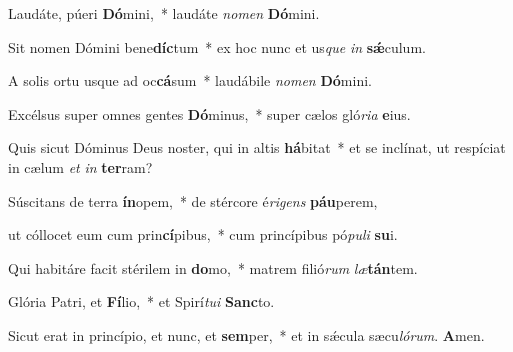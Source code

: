\item Laudáte, púeri \textbf{Dó}mini,~* laudáte \textit{nomen} \textbf{Dó}mini.

\item Sit nomen Dómini bene\textbf{díc}tum~* ex hoc nunc et us\textit{que} \textit{in} \textbf{sǽ}culum.

\item A solis ortu usque ad oc\textbf{cá}sum~* laudábile \textit{nomen} \textbf{Dó}mini.

\item Excélsus super omnes gentes \textbf{Dó}minus,~* super cælos gló\textit{ria} \textbf{e}ius.

\item Quis sicut Dóminus Deus noster, qui in altis \textbf{há}bitat~* et se inclínat, ut respíciat in cælum \textit{et} \textit{in} \textbf{ter}ram?

\item Súscitans de terra \textbf{ín}opem,~* de stércore é\textit{rigens} \textbf{páu}perem,

\item ut cóllocet eum cum prin\textbf{cí}pibus,~* cum princípibus pó\textit{puli} \textbf{su}i.

\item Qui habitáre facit stérilem in \textbf{do}mo,~* matrem filió\textit{rum} \textit{læ}\textbf{tán}tem.

\item Glória Patri, et \textbf{Fí}lio,~* et Spirí\textit{tui} \textbf{Sanc}to.

\item Sicut erat in princípio, et nunc, et \textbf{sem}per,~* et in sǽcula sæcu\textit{lórum}. \textbf{A}men.